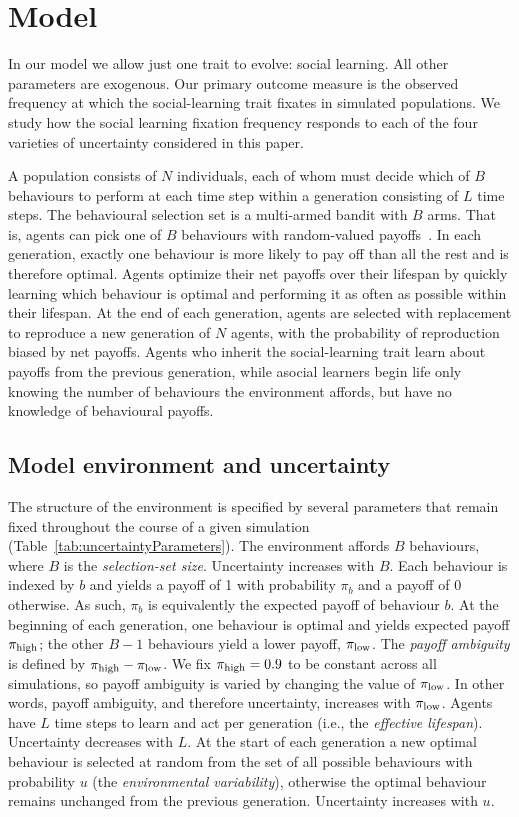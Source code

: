 \documentclass[letterpaper,11.5pt]{scrartcl}
\begin{document}
\section{Model}

In our model we allow just one trait to evolve: social learning. All other parameters are exogenous. Our primary outcome measure is the observed frequency at which the social-learning trait fixates in simulated populations. We study how the social learning fixation frequency responds to each of the four varieties of uncertainty considered in this paper. 

A population consists of $N$ individuals, each of whom must decide which of $B$ behaviours to perform at
each time step within a generation consisting of $L$ time steps. The behavioural selection set is a multi-armed bandit with $B$ arms. That is, agents can pick one of $B$ behaviours with random-valued payoffs~\citep{SuttonBartoBook,McElreath2005,Steyvers2009,Rendell2010,Schulz2019}. In each generation, exactly one behaviour is more likely to pay off than all the rest and is therefore optimal. Agents optimize their net payoffs over their lifespan by quickly learning which behaviour is optimal and performing it as often as possible within their lifespan. At the end of each generation, agents are selected with replacement to reproduce a new generation of $N$ agents, with the probability of reproduction biased by net payoffs. Agents who inherit the social-learning trait learn about payoffs from the previous generation, while asocial learners begin life only knowing the number of behaviours the environment affords, but have no knowledge of behavioural payoffs.


\subsection{Model environment and uncertainty}

The structure of the environment is specified by several parameters that remain fixed throughout the course of a given simulation (Table~\ref{tab:uncertaintyParameters}).  The environment affords $B$ behaviours, where $B$ is the \emph{selection-set size}. Uncertainty increases with $B$. Each behaviour is indexed by $b$ and yields a payoff of 1 with probability $\pi_b$ and a payoff of 0 otherwise. As such, $\pi_b$ is equivalently the expected payoff of behaviour $b$. At the beginning of each generation, one behaviour is optimal and yields expected payoff $\pi_{\mathrm{high}}$; the other $B-1$ behaviours yield a lower payoff, $\pi_{\mathrm{low}}$. The \emph{payoff ambiguity} is defined by $\pi_{\mathrm{high}} - \pi_{\mathrm{low}}$. We fix $\pi_{\mathrm{high}} = 0.9$ to be constant across all simulations, so payoff ambiguity is varied by changing the value of $\pi_{\mathrm{low}}$. In other words, payoff ambiguity, and therefore uncertainty, increases with $\pi_{\mathrm{low}}$.  Agents have $L$ time steps to learn and act per generation (i.e., the \emph{effective lifespan}). Uncertainty decreases with $L$. At the start of each generation a new optimal behaviour is selected at random from the set of all possible behaviours with probability $u$ (the \emph{environmental variability}), otherwise the optimal behaviour remains unchanged from the previous generation. Uncertainty increases with $u$.
\end{document}
